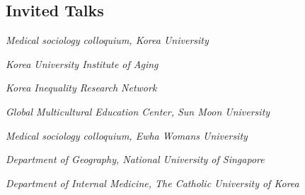 \subsection{Invited Talks}
\begin{aka}
    \item [2025]
    \begin{akb}
        \item \textit{Medical sociology colloquium, Korea University}
    \end{akb}

    \item [2025]
    \begin{akb}
        \item \textit{Korea University Institute of Aging}
        \item \textit{Korea Inequality Research Network}
    \end{akb}

    \item [2024]
    \begin{akb}
        \item \textit{Global Multicultural Education Center, Sun Moon University}
    \end{akb}

    \item [2024]
    \begin{akb}
        \item \textit{Medical sociology colloquium, Ewha Womans University}
    \end{akb}

    \item [2024]
    \begin{akb}
        \item \textit{Department of Geography, National University of Singapore}
    \end{akb}

    \item [2023]
    \begin{akb}
        \item \textit{Department of Internal Medicine, The Catholic University of Korea}
    \end{akb}


\end{aka}
